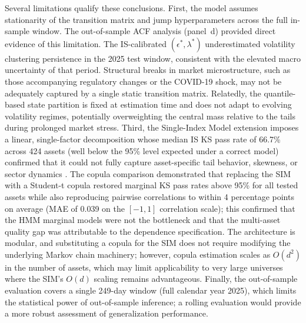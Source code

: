 Several limitations qualify these conclusions. First, the model assumes stationarity of the transition matrix and jump hyperparameters across the full in-sample window. The out-of-sample ACF analysis (panel~d) provided direct evidence of this limitation. The IS-calibrated $(\epsilon^*,\lambda^*)$ underestimated volatility clustering persistence in the 2025 test window, consistent with the elevated macro uncertainty of that period. Structural breaks in market microstructure, such as those accompanying regulatory changes or the COVID-19 shock, may not be adequately captured by a single static transition matrix. Relatedly, the quantile-based state partition is fixed at estimation time and does not adapt to evolving volatility regimes, potentially overweighting the central mass relative to the tails during prolonged market stress. Third, the Single-Index Model extension imposes a linear, single-factor decomposition whose median IS KS pass rate of 66.7\% across 424 assets (well below the 95\% level expected under a correct model) confirmed that it could not fully capture asset-specific tail behavior, skewness, or sector dynamics \cite{sharpe_simplified_1963, fama_french_1993}. The copula comparison demonstrated that replacing the SIM with a Student-t copula restored marginal KS pass rates above 95\% for all tested assets while also reproducing pairwise correlations to within 4 percentage points on average (MAE of 0.039 on the $[-1,1]$ correlation scale); this confirmed that the HMM marginal models were not the bottleneck and that the multi-asset quality gap was attributable to the dependence specification. The architecture is modular, and substituting a copula for the SIM does not require modifying the underlying Markov chain machinery; however, copula estimation scales as $O(d^2)$ in the number of assets, which may limit applicability to very large universes where the SIM's $O(d)$ scaling remains advantageous. Finally, the out-of-sample evaluation covers a single 249-day window (full calendar year 2025), which limits the statistical power of out-of-sample inference; a rolling evaluation would provide a more robust assessment of generalization performance.

